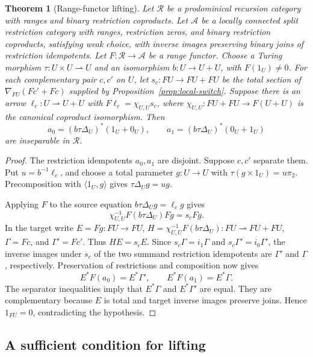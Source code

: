 \documentclass[11pt]{article}
\newtheorem{theorem}{Theorem}[section]
\begin{document}
\begin{theorem}[Range-functor lifting]\label{thm:local-lifting}
Let $\mathscr R$ be a prodominical recursion category with ranges and
binary restriction coproducts. Let $\mathcal A$ be a locally connected
split restriction category with ranges, restriction zeros, and binary
restriction coproducts, satisfying weak choice, with inverse images
preserving binary joins of restriction idempotents. Let
$F:\mathscr R\to\mathcal A$ be a range functor.
Choose a Turing morphism $\tau:U\times U\rightharpoonup U$ and
an isomorphism $b:U\to U+U$, with $F(1_U)\ne0$.
For each complementary pair $c,c'$ on $U$, let
$s_c:FU\to FU+FU$ be the total section of $\nabla_{FU}(Fc'+Fc)$ supplied by
Proposition~\ref{prop:local-switch}. Suppose there is an arrow
$\ell_c:U\rightharpoonup U+U$ with
$F\ell_c=\chi_{U,U}s_c$, where
$\chi_{U,U}:FU+FU\to F(U+U)$ is the canonical coproduct isomorphism.
Then
\[
 a_0=(b\tau\Delta_U)^*(1_U+0_U),\qquad
 a_1=(b\tau\Delta_U)^*(0_U+1_U)
\]
are inseparable in $\mathscr R$.
\end{theorem}
\begin{proof}
The restriction idempotents $a_0,a_1$ are disjoint. Suppose $c,c'$ separate them.
Put $u=b^{-1}\ell_c$, and choose a total parameter $g:U\to U$ with
$\tau(g\times1_U)=u\pi_2$. Precomposition with $\langle1_U,g\rangle$
gives $\tau\Delta_Ug=ug$.

Applying $F$ to the source equation
$b\tau\Delta_Ug=\ell_cg$ gives
\[
 \chi_{U,U}^{-1}F(b\tau\Delta_U)Fg=s_cFg.
\]
In the target write $E=Fg:FU\to FU$,
$H=\chi_{U,U}^{-1}F(b\tau\Delta_U):FU\rightharpoonup FU+FU$,
$\Gamma=Fc$, and $\Gamma'=Fc'$. Thus $HE=s_cE$.
Since $s_c\Gamma=i_1\Gamma$ and $s_c\Gamma'=i_0\Gamma'$,
the inverse images under $s_c$ of the two summand restriction idempotents are
$\Gamma'$ and $\Gamma$,
respectively. Preservation of restrictions and composition now gives
\[
 E^*F(a_0)=E^*\Gamma',\qquad E^*F(a_1)=E^*\Gamma.
\]
The separator inequalities imply that $E^*\Gamma$ and $E^*\Gamma'$
are equal. They are complementary because $E$ is total and target
inverse images preserve joins. Hence $1_{FU}=0$, contradicting the
hypothesis.
\end{proof}

\subsection{A sufficient condition for lifting}
\end{document}
